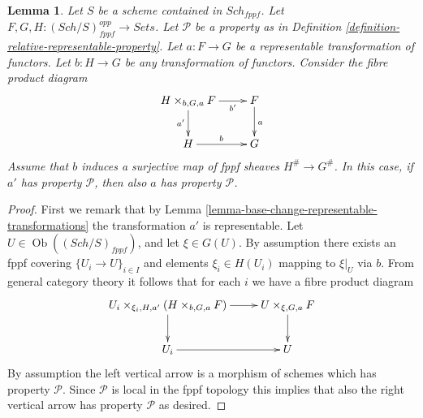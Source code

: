 \documentclass[10pt,a4paper]{amsart}
\theoremstyle{plain}
\newtheorem{lemma}[subsection]{Lemma}
\theoremstyle{definition}
\theoremstyle{remark}
\numberwithin{equation}{subsection}
\def\Sch{\mathit{Sch}}
\def\Ob{\mathop{\mathrm{Ob}}\nolimits}
\begin{document}
\begin{lemma}
\label{lemma-descent-representable-transformations-property}
Let $S$ be a scheme contained in $\Sch_{fppf}$.
Let $F, G, H : (\Sch/S)_{fppf}^{opp} \to \textit{Sets}$.
Let $\mathcal{P}$ be a property as in
Definition \ref{definition-relative-representable-property}.
Let $a : F \to G$ be a representable transformation of functors.
Let $b : H \to G$ be any transformation of functors.
Consider the fibre product diagram
$$
\xymatrix{
H \times_{b, G, a} F \ar[r]_-{b'} \ar[d]_{a'} & F \ar[d]^a \\
H \ar[r]^b & G
}
$$
Assume that $b$ induces a surjective map of fppf sheaves $H^\# \to G^\#$.
In this case, if $a'$ has property $\mathcal{P}$, then also $a$
has property $\mathcal{P}$.
\end{lemma}

\begin{proof}
First we remark that by
Lemma \ref{lemma-base-change-representable-transformations}
the transformation $a'$ is representable.
Let $U \in \Ob((\Sch/S)_{fppf})$, and let
$\xi \in G(U)$. By assumption there exists an fppf covering
$\{U_i \to U\}_{i \in I}$ and elements $\xi_i \in H(U_i)$ mapping
to $\xi|_U$ via $b$. From general category theory it follows that for
each $i$ we have a fibre product diagram
$$
\xymatrix{
U_i \times_{\xi_i, H, a'} (H \times_{b, G, a} F) \ar[r] \ar[d] &
U \times_{\xi, G, a} F \ar[d] \\
U_i \ar[r] & U
}
$$
By assumption the left vertical arrow is a morphism of schemes which
has property $\mathcal{P}$. Since $\mathcal{P}$ is local in the fppf
topology this implies that also the right vertical arrow has property
$\mathcal{P}$ as desired.
\end{proof}
\end{document}
